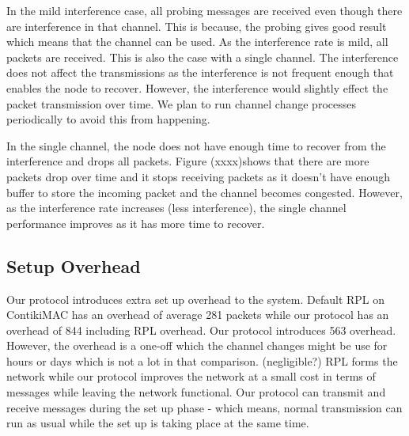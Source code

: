 In the mild interference case, all probing messages are received even though there are interference in that channel. This is because, the probing gives good result which means that the channel can be used. As the interference rate is mild, all packets are received. This is also the case with a single channel. The interference does not affect the transmissions as the interference is not frequent enough that enables the node to recover. However, the interference would slightly effect the packet transmission over time. We plan to run channel change processes periodically to avoid this from happening. %

In the single channel, the node does not have enough time to recover from the interference and drops all packets. Figure (xxxx)shows that there are more packets drop over time and it stops receiving packets as it doesn't have enough buffer to store the incoming packet and the channel becomes congested. However, as the interference rate increases (less interference), the single channel performance improves as it has more time to recover.

\subsection{Setup Overhead}




Our protocol introduces extra set up overhead to the system. Default RPL on ContikiMAC has an overhead of average 281 packets while our protocol has an overhead of 844 including RPL overhead. Our protocol introduces 563 overhead. However, the overhead is a one-off which the channel changes might be use for hours or days which is not a lot in that comparison. (negligible?) RPL forms the network while our protocol improves the network at a small cost in terms of messages while leaving the network functional. Our protocol can transmit and receive messages during the set up phase - which means, normal transmission can run as usual while the set up is taking place at the same time.   